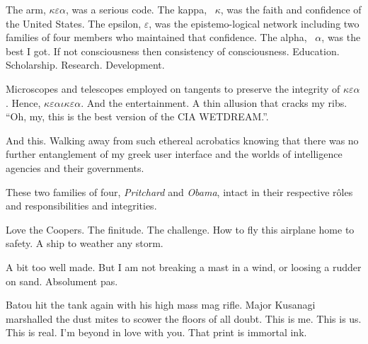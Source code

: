

The arm, $\kappa\varepsilon\alpha$, was a serious code.  The kappa, \
$\kappa$, was the faith and confidence of the United States.  The
epsilon, $\varepsilon$, was the epistemo-logical network including two
families of four members who maintained that confidence.  The alpha, \
$\alpha$, was the best I got.  If not consciousness then consistency
of consciousness.  Education.  Scholarship.  Research.  Development.

Microscopes and telescopes employed on tangents to preserve the
integrity of $\kappa\varepsilon\alpha$.  Hence,
$\kappa\varepsilon\alpha \iota\kappa\varepsilon\alpha$.  And the
entertainment.  A thin allusion that cracks my ribs.  ``Oh, my, this
is the best version of the CIA WETDREAM.''.

And this.  Walking away from such ethereal acrobatics knowing that
there was no further entanglement of my greek user interface and the
worlds of intelligence agencies and their governments.

These two families of four, {\it Pritchard} and {\it Obama}, intact in
their respective r\^oles and responsibilities and integrities.

Love the Coopers.  The finitude.  The challenge.  How to fly this
airplane home to safety.  A ship to weather any storm.  

A bit too well made.  But I am not breaking a mast in a wind, or
loosing a rudder on sand.  Absolument pas.

Batou hit the tank again with his high mass mag rifle.  Major Kusanagi
marshalled the dust mites to scower the floors of all doubt.  This is
me.  This is us.  This is real.  I'm beyond in love with you.  That
print is immortal ink.

\bye
